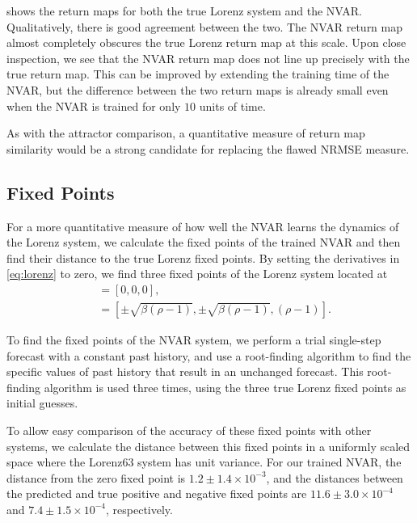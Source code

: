  shows the return maps for both the true
Lorenz system and the NVAR. Qualitatively, there is good agreement
between the two. The NVAR return map almost completely obscures the
true Lorenz return map at this scale. Upon close inspection, we see
that the NVAR return map does not line up precisely with the true
return map. This can be improved by extending the training time of the
NVAR, but the difference between the two return maps is already small
even when the NVAR is trained for only $10$ units of time.

As with the attractor comparison, a quantitative measure of return map
similarity would be a strong candidate for replacing the flawed NRMSE
measure.

\subsection{Fixed Points}

For a more quantitative measure of how well the NVAR learns the
dynamics of the Lorenz system, we calculate the fixed points of the
trained NVAR and then find their distance to the true Lorenz fixed
points. By setting the derivatives in \cref{eq:lorenz} to zero, we
find three fixed points of the Lorenz system located at
\begin{align}
  [x, y, z] &= [0, 0, 0], \\
            &= [\pm \sqrt{\beta(\rho - 1)}, \pm \sqrt{\beta(\rho - 1)}, (\rho - 1)].
\end{align}

To find the fixed points of the NVAR system, we perform a trial
single-step forecast with a constant past history, and use a
root-finding algorithm to find the specific values of past history
that result in an unchanged forecast. This root-finding algorithm is
used three times, using the three true Lorenz fixed points as initial
guesses.

To allow easy comparison of the accuracy of these fixed points with
other systems, we calculate the distance between this fixed points in
a uniformly scaled space where the Lorenz63 system has unit
variance. For our trained NVAR, the distance from the zero fixed point
is $1.2\pm1.4\times10^{-3}$, and the distances between the predicted
and true positive and negative fixed points are
$11.6\pm3.0\times10^{-4}$ and $7.4\pm1.5\times10^{-4}$, respectively.


